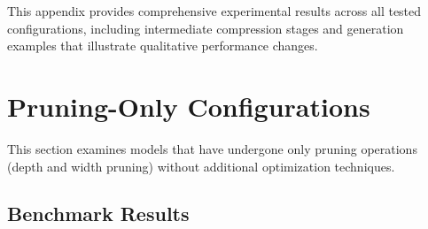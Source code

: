This appendix provides comprehensive experimental results across all tested configurations, including intermediate compression stages and generation examples that illustrate qualitative performance changes.

\section{Pruning-Only Configurations}

This section examines models that have undergone only pruning operations (depth and width pruning) without additional optimization techniques.

\subsection{Benchmark Results}

